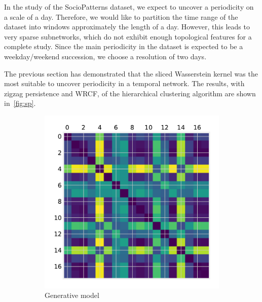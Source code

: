 \documentclass[a4paper,11pt,openany,extrafontsizes]{memoir}
\begin{document}
In the study of the SocioPatterns dataset, we expect to uncover a
periodicity on a scale of a day. Therefore, we would like to partition
the time range of the dataset into windows approximately the length of
a day. However, this leads to very sparse subnetworks, which do not
exhibit enough topological features for a complete study. Since the
main periodicity in the dataset is expected to be a weekday/weekend
succession, we choose a resolution of two days.

The previous section has demonstrated that the sliced Wasserstein
kernel was the most suitable to uncover periodicity in a temporal
network. The results, with zigzag persistence and WRCF, of the
hierarchical clustering algorithm are shown in~\autoref{fig:sp}.

\begin{figure}[ht]
  \centering
  \begin{subfigure}[b]{0.45\linewidth}
    \includegraphics[width=\linewidth]{fig/gen_zz_gram1.pdf}
    \caption{Generative model}%
    \label{fig:gram_gen}
  \end{subfigure}\qquad
  \begin{subfigure}[b]{0.45\linewidth}

\end{subfigure}
\end{figure}
\end{document}

